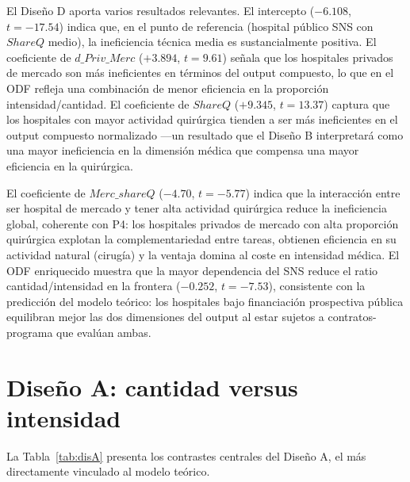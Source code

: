 \documentclass[12pt, a4paper, twoside, openright]{book}
\theoremstyle{plain}
\theoremstyle{definition}
\theoremstyle{remark}
\begin{document}
El Diseño D aporta varios resultados relevantes. El intercepto ($-6.108$, $t=-17.54$) indica que, en el punto de referencia (hospital público SNS con $ShareQ$ medio), la ineficiencia técnica media es sustancialmente positiva. El coeficiente de $d\_Priv\_Merc$ ($+3.894$, $t=9.61$) señala que los hospitales privados de mercado son más ineficientes en términos del output compuesto, lo que en el ODF refleja una combinación de menor eficiencia en la proporción intensidad/cantidad. El coeficiente de $ShareQ$ ($+9.345$, $t=13.37$) captura que los hospitales con mayor actividad quirúrgica tienden a ser más ineficientes en el output compuesto normalizado ---un resultado que el Diseño B interpretará como una mayor ineficiencia en la dimensión médica que compensa una mayor eficiencia en la quirúrgica.

El coeficiente de $Merc\_shareQ$ ($-4.70$, $t=-5.77$) indica que la interacción entre ser hospital de mercado y tener alta actividad quirúrgica reduce la ineficiencia global, coherente con P4: los hospitales privados de mercado con alta proporción quirúrgica explotan la complementariedad entre tareas, obtienen eficiencia en su actividad natural (cirugía) y la ventaja domina al coste en intensidad médica. El ODF enriquecido muestra que la mayor dependencia del SNS reduce el ratio cantidad/intensidad en la frontera ($-0.252$, $t=-7.53$), consistente con la predicción del modelo teórico: los hospitales bajo financiación prospectiva pública equilibran mejor las dos dimensiones del output al estar sujetos a contratos-programa que evalúan ambas.


\section{Diseño A: cantidad versus intensidad}
\label{sec:res_A}

La Tabla~\ref{tab:disA} presenta los contrastes centrales del Diseño A, el más directamente vinculado al modelo teórico.
\end{document}
